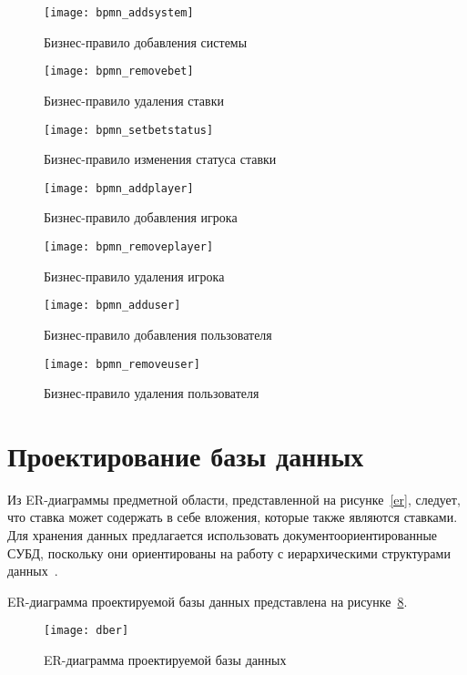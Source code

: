 \begin{figure}[H]
	\centering
	\texttt{[image: bpmn\_addsystem]}
	\caption{Бизнес-правило добавления системы}
	\label{bpmn_addsystem}
\end{figure}
\begin{figure}[H]
	\centering
	\texttt{[image: bpmn\_removebet]}
	\caption{Бизнес-правило удаления ставки}
	\label{bpmn_removebet}
\end{figure}
\begin{figure}[H]
	\centering
	\texttt{[image: bpmn\_setbetstatus]}
	\caption{Бизнес-правило изменения статуса ставки}
	\label{bpmn_setbetstatus}
\end{figure}
\begin{figure}[H]
	\centering
	\texttt{[image: bpmn\_addplayer]}
	\caption{Бизнес-правило добавления игрока}
	\label{bpmn_addplayer}
\end{figure}
\begin{figure}[H]
	\centering
	\texttt{[image: bpmn\_removeplayer]}
	\caption{Бизнес-правило удаления игрока}
	\label{bpmn_removeplayer}
\end{figure}
\begin{figure}[H]
	\centering
	\texttt{[image: bpmn\_adduser]}
	\caption{Бизнес-правило добавления пользователя}
	\label{bpmn_adduser}
\end{figure}
\begin{figure}[H]
	\centering
	\texttt{[image: bpmn\_removeuser]}
	\caption{Бизнес-правило удаления пользователя}
	\label{bpmn_removeuser}
\end{figure}

\section{Проектирование базы данных}

Из ER-диаграммы предметной области, представленной на рисунке~\ref{er}, следует, что ставка может содержать в себе вложения, которые также являются ставками. Для хранения данных предлагается использовать документоориентированные СУБД, поскольку они ориентированы на работу с иерархическими структурами данных~\cite{docdb}.

ER-диаграмма проектируемой базы данных представлена на рисунке~\ref{dber}.
\begin{figure}[H]
	\centering
	\texttt{[image: dber]}
	\caption{ER-диаграмма проектируемой базы данных}
	\label{dber}
\end{figure}


